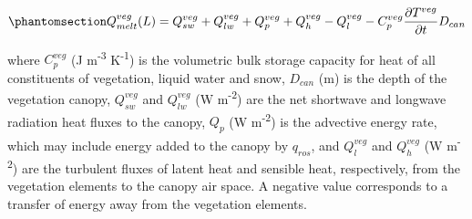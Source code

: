 \documentclass[
  letterpaper,
]{tex/uofsthesis-cs}
\begin{document}
\begin{equation}\phantomsection\label{eq-canopy-energy-flux-mp15}{
Q_{melt}^{veg}(L) = 
Q_{sw}^{veg} +
Q_{lw}^{veg} +
Q_{p}^{veg} + Q_{h}^{veg} - Q_{l}^{veg} - C_p^{veg} \frac{\partial T^{veg}}{\partial t} D_{can}
}\end{equation}

where \(C_p^{veg}\) (J m\textsuperscript{-3} K\textsuperscript{-1}) is
the volumetric bulk storage capacity for heat of all constituents of
vegetation, liquid water and snow, \(D_{can}\) (m) is the depth of the
vegetation canopy, \(Q_{sw}^{veg}\) and \(Q_{lw}^{veg}\) (W
m\textsuperscript{-2}) are the net shortwave and longwave radiation heat
fluxes to the canopy, \(Q_p\) (W m\textsuperscript{-2}) is the advective
energy rate, which may include energy added to the canopy by
\(q_{ros}\), and \(Q_{l}^{veg}\) and \(Q_{h}^{veg}\) (W
m\textsuperscript{-2}) are the turbulent fluxes of latent heat and
sensible heat, respectively, from the vegetation elements to the canopy
air space. A negative value corresponds to a transfer of energy away
from the vegetation elements.
\end{document}
